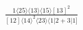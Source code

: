 \documentclass[varwidth, border=5pt]{standalone}
\begin{document}
\begin{my}
$\begin{gathered}
\scriptscriptstyle\frac{1⟨25⟩⟨13⟩⟨15⟩[13]^2}{[12]⟨14⟩^2⟨23⟩⟨1|2+3|1]}
\end{gathered}$
\end{my}
\end{document}
